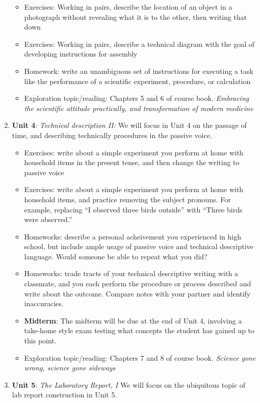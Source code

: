 \documentclass[10pt]{article}
\begin{document}
\begin{enumerate}
\begin{itemize}
\item Exercises: Working in pairs, describe the location of an object in a photograph without revealing what it is to the other, then writing that down
\item Exercises: Working in pairs, describe a technical diagram with the goal of developing instructions for assembly
\item Homework: write an unambiguous set of instructions for executing a task like the performance of a scientific experiment, procedure, or calculation
\item Exploration topic/reading: Chapters 5 and 6 of course book. \textit{Embracing the scientific attitude practically, and transformation of modern medicine}
\end{itemize}
\item \textbf{Unit 4}: \textit{Technical description II:} We will focus in Unit 4 on the passage of time, and describing technically procedures in the passive voice.
\begin{itemize}
\item Exercises: write about a simple experiment you perform at home with household items in the present tense, and then change the writing to passive voice
\item Exercises: write about a simple experiment you perform at home with household items, and practice removing the subject pronouns.  For example, replacing ``I observed three birds outside'' with ``Three birds were observed.''
\item Homeworks: describe a personal acheivement you experienced in high school, but include ample usage of passive voice and technical descriptive language.  Would someone be able to repeat what you did?
\item Homeworks: trade tracts of your technical descriptive writing with a classmate, and you each perform the procedure or process described and write about the outcome.  Compare notes with your partner and identify inaccuracies.
\item \textbf{Midterm}: The midterm will be due at the end of Unit 4, involving a take-home style exam testing what concepts the student has gained up to this point.
\item Exploration topic/reading: Chapters 7 and 8 of course book. \textit{Science gone wrong, science gone sideways}
\end{itemize}
\item \textbf{Unit 5}: \textit{The Laboratory Report, I} We will focus on the ubiquitous topic of lab report construction in Unit 5.

\end{enumerate}
\end{document}
